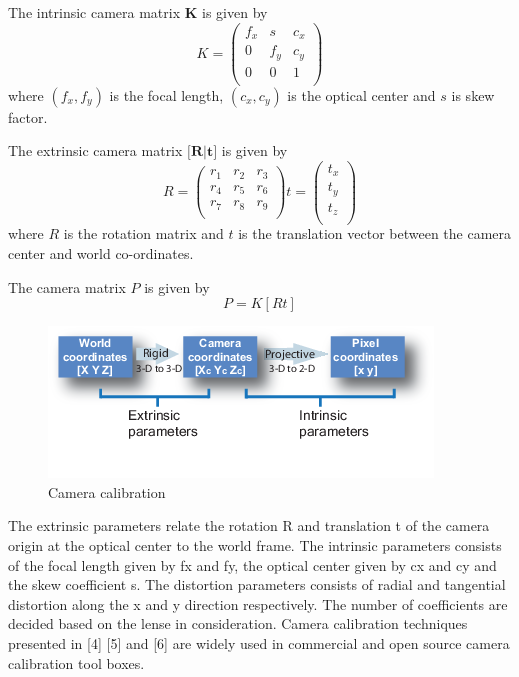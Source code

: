 The intrinsic camera matrix \textbf{K} is given by
\begin{equation}
K = 
\begin{pmatrix}
  f_x & s & c_x \\
  0 & f_y & c_y \\
  0 & 0 & 1 \\
 \end{pmatrix}
\end{equation}
where $(f_x, f_y)$ is the focal length, $(c_x, c_y)$ is the optical center
and $s$ is skew factor.

The extrinsic camera matrix $\textbf{[R|t]}$ is given by
\begin{equation}
R = 
\begin{pmatrix}
  r_1 & r_2 & r_3 \\
  r_4 & r_5 & r_6 \\
  r_7 & r_8 & r_9 \\
 \end{pmatrix}
t = 
\begin{pmatrix}
  t_x \\
  t_y \\
  t_z \\
 \end{pmatrix}
\end{equation}
where $R$ is the rotation matrix and $t$ is the translation vector between the camera center and world co-ordinates. 

The camera matrix $P$ is given by 
\begin{equation}
P = K[R t]
\end{equation}

\begin{figure}[H]
  \includegraphics[width=\textwidth]{./figures/imageParams.png}
\caption{Camera calibration}
\label{fig:2}       %
\end{figure}

The extrinsic parameters relate the rotation R and translation t of the camera origin at the optical center to the world frame. The intrinsic parameters consists of the focal length given by fx and fy, the optical center given by cx and cy and the skew coefficient s. The distortion parameters consists of radial and tangential distortion along the x and y direction respectively. The number of coefficients are decided based on the lense in consideration. Camera calibration techniques presented in [4] [5] and [6] are widely used in commercial and open source camera calibration tool boxes.